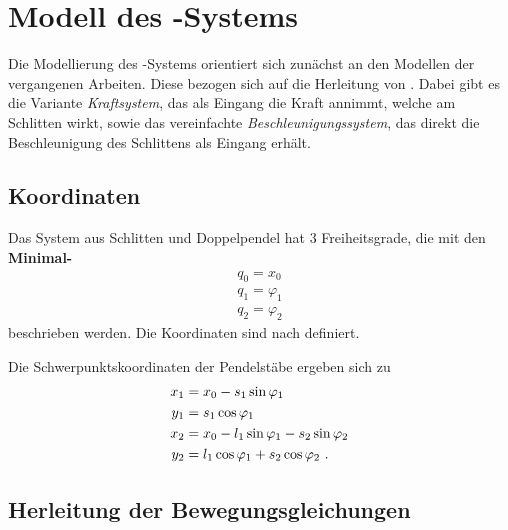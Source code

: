\section{Modell des \spd-Systems}\label{sec:spdModell}


Die Modellierung des \spd-Systems orientiert sich zunächst an den Modellen der vergangenen Arbeiten. 
Diese bezogen sich auf die Herleitung von \cite{modpen}. 
Dabei gibt es die Variante \emph{Kraftsystem}, das als Eingang die Kraft annimmt, welche am Schlitten wirkt, sowie das vereinfachte \emph{Beschleunigungssystem}, das direkt die Beschleunigung des Schlittens als Eingang erhält.



\begin{figure}[h]
	\centering
		
			\caption{\dpd}
	 \label{fig:koord}
\end{figure}

\subsection{Koordinaten}

Das System aus Schlitten und Doppelpendel hat 3 Freiheitsgrade, die mit den \textbf{Minimal-\koor} 
\begin{align*}
	q_0 = x_0  \\
	q_1 = \varphi_1  \\
	q_2 = \varphi_2
\end{align*}
beschrieben werden. Die Koordinaten sind nach  definiert.

Die Schwerpunktskoordinaten der Pendelstäbe ergeben sich zu
\begin{align*}
	x_1 &= x_0 - s_1 \sin{\ensuremath{\varphi_1}}  \\
	y_1 &=       s_1 \cos{\ensuremath{\varphi_1}}  \\
	x_2 &= x_0 - l_1 \sin{\ensuremath{\varphi_1}} - s_2 \sin{\ensuremath{\varphi_2}}  \\
	y_2 &=       l_1 \cos{\ensuremath{\varphi_1}} + s_2 \cos{\ensuremath{\varphi_2}}  \ .
\end{align*}


\subsection{Herleitung der Bewegungsgleichungen}

